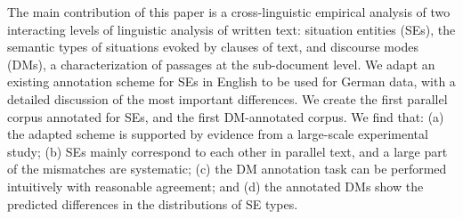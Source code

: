 The main contribution of this paper is a cross-linguistic empirical analysis of two interacting levels of linguistic analysis of written text: situation entities (SEs), the semantic types of situations evoked by clauses of text, and discourse modes (DMs), a characterization of passages at the sub-document level. We adapt an existing annotation scheme for SEs in English to be used for German data, with a detailed discussion of the most important differences. We create the first parallel corpus annotated for SEs, and the first DM-annotated corpus. We find that: (a) the adapted scheme is supported by evidence from a large-scale experimental study; (b) SEs mainly correspond to each other in parallel text, and a large part of the mismatches are systematic; (c) the DM annotation task can be performed intuitively with reasonable agreement; and (d) the annotated DMs show the predicted differences in the distributions of SE types.
